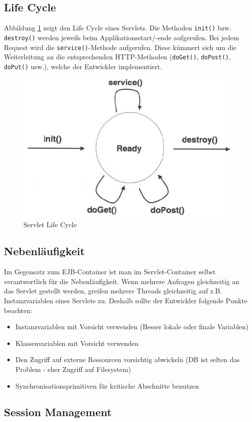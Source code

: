 \subsection{Life Cycle}

Abbildung \ref{fig:servlet-life-cycle} zeigt den Life Cycle eines Servlets. Die Methoden \verb|init()| bzw. \verb|destroy()| werden jeweils beim Applikationsstart/-ende aufgerufen. Bei jedem Request wird die \verb|service()|-Methode aufgerufen. Diese kümmert sich um die Weiterleitung an die entsprechenden HTTP-Methoden (\verb|doGet()|, \verb|doPost()|, \verb|doPut()| usw.), welche der Entwickler implementiert.

\begin{figure}
\centering
\includegraphics[width=0.4\linewidth]{fig/servlet-life-cycle}
\caption{Servlet Life Cycle}
\label{fig:servlet-life-cycle}
\end{figure}

\subsection{Nebenläufigkeit}

Im Gegensatz zum EJB-Container ist man im Servlet-Container selbst verantwortlich für die Nebenläufigkeit. Wenn mehrere Anfragen gleichzeitig an das Servlet gestellt werden, greifen mehrere Threads gleichzeitig auf z.B. Instanzvariablen eines Servlets zu. Deshalb sollte der Entwickler folgende Punkte beachten:

\begin{itemize}
	\item Instanzvariablen mit Vorsicht verwenden (Besser lokale oder finale Variablen)
	\item Klassenvariablen mit Vorsicht verwenden
	\item Den Zugriff auf externe Ressourcen vorsichtig abwickeln (DB ist selten das Problem - eher Zugriff auf Filesystem)
	\item Synchronisationsprimitiven für kritische Abschnitte benutzen
\end{itemize}

\subsection{Session Management}


